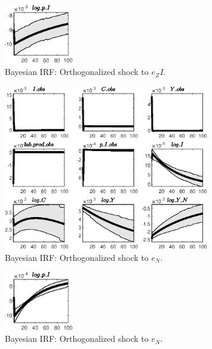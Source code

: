\begin{figure}[H]
\centering 
\includegraphics[width=0.27\textwidth]{BRS_extended_fd/Output/BRS_extended_fd_Bayesian_IRF_e_ZI_2}
\caption{Bayesian IRF: Orthogonalized shock to ${e_ZI}$.}
\label{Fig:BayesianIRF:e_ZI:2}
\end{figure}
 
\begin{figure}[H]
\centering 
\includegraphics[width=0.80\textwidth]{BRS_extended_fd/Output/BRS_extended_fd_Bayesian_IRF_e_N_1}
\caption{Bayesian IRF: Orthogonalized shock to ${e_N}$.}
\label{Fig:BayesianIRF:e_N:1}
\end{figure}
 
\begin{figure}[H]
\centering 
\includegraphics[width=0.27\textwidth]{BRS_extended_fd/Output/BRS_extended_fd_Bayesian_IRF_e_N_2}
\caption{Bayesian IRF: Orthogonalized shock to ${e_N}$.}
\label{Fig:BayesianIRF:e_N:2}
\end{figure}
 
